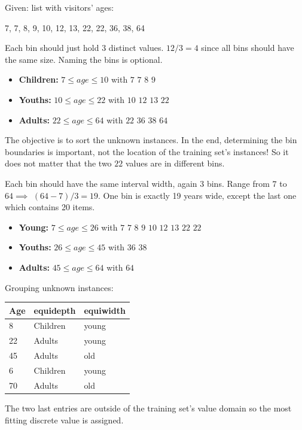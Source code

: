 \begin{breakbox}

Given: list with visitors' ages:

\begin{center}
7, 7, 8, 9, 10, 12, 13, 22, 22, 36, 38, 64
\end{center}

\begin{breakbox}
Each bin should just hold 3 distinct values. $12/3=4$ since all bins should have the same size. Naming the bins is optional.

\begin{itemize}
	\item \textbf{Children:} $7 \leq age \le 10$ with $7$ $7$ $8$ $9$
	\item \textbf{Youths:} $10 \leq age \le 22$ with $10$ $12$ $13$ $22$
	\item \textbf{Adults:} $22 \leq age \leq 64$ with $22$ $36$ $38$ $64$
\end{itemize}

The objective is to sort the unknown instances. In the end, determining the bin boundaries is important, not the location of the training set's instances! So it does not matter that the two $22$ values are in different bins.
\end{breakbox}



\begin{breakbox}
Each bin should have the same interval width, again 3 bins.  Range from $7$ to $64 \implies$ $(64-7)/3=19$. One bin is exactly 19 years wide, except the last one which contains 20 items.

\begin{itemize}
	\item \textbf{Young:} $7 \leq age \le 26$ with $7$ $7$ $8$ $9$ $10$ $12$ $13$ $22$ $22$
	\item \textbf{Youths:} $26 \leq age \le 45$ with $36$ $38$
	\item \textbf{Adults:} $45 \leq age \leq 64$ with $64$	
\end{itemize}
\end{breakbox}

Grouping unknown instances:

\begin{tabular}{l|l|l}
\textbf{Age} & \textbf{equidepth} & \textbf{equiwidth} \\
\hline
8   & Children  & young     \\
22  & Adults    & young     \\
45  & Adults    & old       \\
6   & Children  & young     \\
70  & Adults    & old      
\end{tabular}

The two last entries are outside of the training set's value domain so the most fitting discrete value is assigned.
\end{breakbox}



